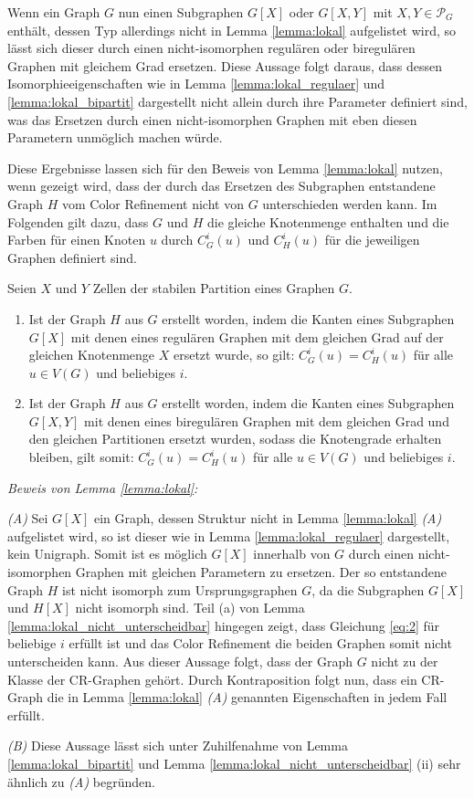 Wenn ein Graph $G$ nun einen Subgraphen $G[X]$ oder $G[X,Y]$ mit $X,Y\in \mathcal{P}_G$ enthält, dessen Typ allerdings nicht in Lemma \ref{lemma:lokal} aufgelistet wird, so lässt sich dieser durch einen nicht-isomorphen regulären oder biregulären Graphen mit gleichem Grad ersetzen. Diese Aussage folgt daraus, dass dessen Isomorphieeigenschaften wie in Lemma \ref{lemma:lokal_regulaer} und \ref{lemma:lokal_bipartit} dargestellt nicht allein durch ihre Parameter definiert sind, was das Ersetzen durch einen nicht-isomorphen Graphen mit eben diesen Parametern unmöglich machen würde.

Diese Ergebnisse lassen sich für den Beweis von Lemma \ref{lemma:lokal} nutzen, wenn gezeigt wird, dass der durch das Ersetzen des Subgraphen entstandene Graph $H$ vom Color Refinement nicht von $G$ unterschieden werden kann. Im Folgenden gilt dazu, dass $G$ und $H$ die gleiche Knotenmenge enthalten und die Farben für einen Knoten $u$ durch $C^i_G(u)$ und $C^i_H(u)$ für die jeweiligen Graphen definiert sind.

\begin{Lemma}
	Seien $X$ und $Y$ Zellen der stabilen Partition eines Graphen $G$.
	\begin{enumerate}[label=(\alph*)]
		\item  Ist der Graph $H$ aus $G$ erstellt worden, indem die Kanten eines Subgraphen $G[X]$ mit denen eines regulären Graphen mit dem gleichen Grad auf der gleichen Knotenmenge $X$ ersetzt wurde, so gilt: $C^i_G(u)=C^i_H(u)$ für alle $u\in V(G)$ und beliebiges $i$.
		\item Ist der Graph $H$ aus $G$ erstellt worden, indem die Kanten eines Subgraphen $G[X,Y]$ mit denen eines biregulären Graphen mit dem gleichen Grad und den gleichen Partitionen ersetzt wurden, sodass die Knotengrade erhalten bleiben, gilt somit: $C^i_G(u)=C^i_H(u)$ für alle $u\in V(G)$ und beliebiges $i$.
	\end{enumerate}
	\label{lemma:lokal_nicht_unterscheidbar}
\end{Lemma}

\emph{Beweis von Lemma \ref{lemma:lokal}:}

\emph{(A)} Sei $G[X]$ ein Graph, dessen Struktur nicht in Lemma \ref{lemma:lokal} \emph{(A)} aufgelistet wird, so ist dieser wie in Lemma \ref{lemma:lokal_regulaer} dargestellt, kein Unigraph. Somit ist es möglich $G[X]$ innerhalb von $G$ durch einen nicht-isomorphen Graphen mit gleichen Parametern zu ersetzen. Der so entstandene Graph $H$ ist nicht isomorph zum Ursprungsgraphen $G$, da die Subgraphen $G[X]$ und $H[X]$ nicht isomorph sind. Teil (a) von Lemma \ref{lemma:lokal_nicht_unterscheidbar} hingegen zeigt, dass Gleichung \ref{eq:2} für beliebige $i$ erfüllt ist und das Color Refinement die beiden Graphen somit nicht unterscheiden kann. Aus dieser Aussage folgt, dass der Graph $G$ nicht zu der Klasse der CR-Graphen gehört. Durch Kontraposition folgt nun, dass ein CR-Graph die in Lemma \ref{lemma:lokal} \emph{(A)} genannten Eigenschaften in jedem Fall erfüllt.

\emph{(B)} Diese Aussage lässt sich unter Zuhilfenahme von Lemma \ref{lemma:lokal_bipartit} und Lemma \ref{lemma:lokal_nicht_unterscheidbar} (ii) sehr ähnlich zu \emph{(A)} begründen.

